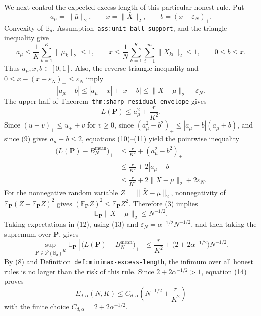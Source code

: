 We next control the expected excess length of this particular honest rule. Put
\[
a_\mu=\|\bar\mu\|_2,
\qquad
x=\|\bar X\|_2,
\qquad
b=(x-\varepsilon_N)_+.
\]
Convexity of \(\mathbb B_d\), Assumption~\texttt{ass:unit-ball-support}, and the triangle inequality give
\[
a_\mu\leq \frac1K\sum_{k=1}^K\|\mu_k\|_2\leq1,
\qquad
x\leq \frac1N\sum_{k=1}^K\sum_{i=1}^m\|X_{ki}\|_2\leq1,
\qquad
0\leq b\leq x. \tag{9}
\]
Thus \(a_\mu,x,b\in[0,1]\). Also, the reverse triangle inequality and \(0\leq x-(x-\varepsilon_N)_+\leq\varepsilon_N\) imply
\[
|a_\mu-b|
\leq |a_\mu-x|+|x-b|
\leq \|\bar X-\bar\mu\|_2+\varepsilon_N. \tag{10}
\]
The upper half of Theorem~\texttt{thm:sharp-residual-envelope} gives
\[
L(\mathbf P)\leq a_\mu^2+\frac r{K^2}. \tag{11}
\]
Since \((u+v)_+\leq u_++v\) for \(v\geq0\), since \((a_\mu^2-b^2)_+\leq |a_\mu-b|(a_\mu+b)\), and since (9) gives \(a_\mu+b\leq2\), equations (10)--(11) yield the pointwise inequality
\[
\begin{aligned}
\bigl(L(\mathbf P)-B_N^{\mathrm{mean}}\bigr)_+
&\leq \frac r{K^2}+(a_\mu^2-b^2)_+\\
&\leq \frac r{K^2}+2|a_\mu-b|\\
&\leq \frac r{K^2}
   +2\|\bar X-\bar\mu\|_2+2\varepsilon_N. \tag{12}
\end{aligned}
\]
For the nonnegative random variable \(Z=\|\bar X-\bar\mu\|_2\), nonnegativity of \(\mathbb E_{\mathbf P}(Z-\mathbb E_{\mathbf P}Z)^2\) gives \((\mathbb E_{\mathbf P}Z)^2\leq\mathbb E_{\mathbf P}Z^2\). Therefore (3) implies
\[
\mathbb E_{\mathbf P}\|\bar X-\bar\mu\|_2\leq N^{-1/2}. \tag{13}
\]
Taking expectations in (12), using (13) and \(\varepsilon_N=\alpha^{-1/2}N^{-1/2}\), and then taking the supremum over \(\mathbf P\), gives
\[
\sup_{\mathbf P\in\mathcal P(\mathbb B_d)^K}
\mathbb E_{\mathbf P}\!\left[\bigl(L(\mathbf P)-B_N^{\mathrm{mean}}\bigr)_+\right]
\leq \frac r{K^2}+\bigl(2+2\alpha^{-1/2}\bigr)N^{-1/2}. \tag{14}
\]
By (8) and Definition~\texttt{def:minimax-excess-length}, the infimum over all honest rules is no larger than the risk of this rule. Since \(2+2\alpha^{-1/2}>1\), equation (14) proves
\[
E_{d,\alpha}(N,K)
\leq C_{d,\alpha}\left(N^{-1/2}+\frac r{K^2}\right) \tag{15}
\]
with the finite choice \(C_{d,\alpha}=2+2\alpha^{-1/2}\).

